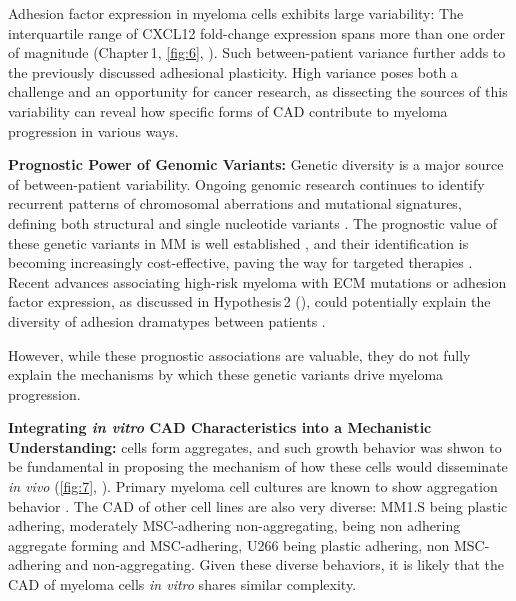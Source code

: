 \unnsubsection{\cadddiversitytitle}%
\label{sec:discussion_cadddiversity}%
Adhesion factor expression in myeloma cells exhibits large variability: The
interquartile range of CXCL12 fold-change expression spans more than one order
of magnitude (Chapter\,1, \autoref{fig:6}, ). Such
between-patient variance further adds to the previously discussed adhesional
plasticity. High
variance poses both a challenge and an opportunity for cancer research, as
dissecting the sources of this variability can reveal how specific forms
of \ac{CAD} contribute to myeloma progression in various ways.


\textbf{Prognostic Power of Genomic Variants:}
Genetic diversity is a major source of between-patient variability. Ongoing
genomic research continues to identify recurrent patterns of chromosomal
aberrations and mutational signatures, defining both structural and single
nucleotide variants \cite{kumarMultipleMyelomasCurrent2018a,
      hoangMutationalProcessesContributing2019}. The prognostic value of these genetic
variants in MM is well established \cite{sharmaPrognosticRoleMYC2021}, and their
identification is becoming increasingly cost-effective, paving the way for
targeted therapies \cite{zouComprehensiveApproachEvaluate2024,
      budurleanIntegratingOpticalGenome2024}. Recent advances associating high-risk
myeloma with \ac{ECM} mutations or adhesion factor expression, as discussed in
Hypothesis\,2 (), could potentially
explain the diversity of adhesion dramatypes between patients
\cite{eversPrognosticValueExtracellular2023,
      huDevelopmentCellAdhesionbased2024}.

However, while these prognostic associations are valuable, they do not fully
explain the mechanisms by which these genetic variants drive myeloma
progression.



\textbf{Integrating \textit{in vitro} \ac{CAD} Characteristics into a
      Mechanistic Understanding:}%
\INA cells form aggregates, and such growth behavior was shwon to be fundamental
in proposing the mechanism of how these cells would disseminate \textit{in vivo}
(\autoref{fig:7}, ). Primary myeloma cell cultures are known to
show aggregation behavior \cite{kawanoHomotypicCellAggregations1991a,
      okunoVitroGrowthPattern1991}. The \ac{CAD} of other cell lines are also very
diverse: MM1.S being plastic adhering, moderately MSC-adhering non-aggregating,
\INA being non adhering aggregate forming and MSC-adhering, U266 being plastic
adhering, non MSC-adhering and non-aggregating. Given these diverse behaviors,
it is likely that the \ac{CAD} of myeloma cells \textit{in vitro} shares similar
complexity.

